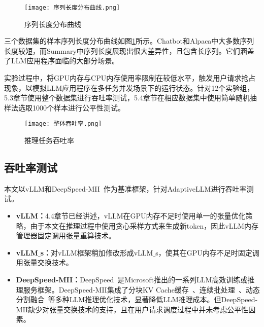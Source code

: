 \begin{figure}[!htbp]
  \centering
  \texttt{[image: 序列长度分布曲线.png]}
  \caption{序列长度分布曲线}
  \label{Fig:序列长度分布曲线}
\end{figure}

三个数据集的样本序列长度分布曲线如图\ref{Fig:序列长度分布曲线}所示。Chatbot和Alpaca中大多数序列长度较短，而Summary中序列长度展现出很大差异性，且包含长序列。它们涵盖了LLM应用程序面临的大部分场景。

实验过程中，将GPU内存与CPU内存使用率限制在较低水平，触发用户请求抢占现象，以模拟LLM应用程序在多任务并发场景下的运行状态。针对12个实验组，5.3章节使用整个数据集进行吞吐率测试，5.4章节在相应数据集中使用简单随机抽样法选取1000个样本进行公平性测试。

\begin{figure*}[!htbp]
  \centering
  \texttt{[image: 整体吞吐率.png]}
  \caption{推理任务吞吐率}
  \label{Fig:推理任务吞吐率}
\end{figure*}

\subsection{吞吐率测试}

本文以vLLM和DeepSpeed-MII~\cite{DeepSpeed-MII}作为基准框架，针对AdaptiveLLM进行吞吐率测试。

\begin{itemize}

  \item \textbf{vLLM：}4.4章节已经讲述，vLLM在GPU内存不足时使用单一的张量优化策略，由于本文在推理过程中使用贪心采样方式来生成新token，因此vLLM内存管理器固定调用张量重算技术。
  
  \item \textbf{vLLM$\_$s：}对vLLM框架稍加修改形成vLLM$\_$s，使其在GPU内存不足时固定调用张量交换技术。
  
  \item \textbf{DeepSpeed-MII：}DeepSpeed~\cite{DeepSpeed}是Microsoft推出的一系列LLM高效训练或推理服务框架。DeepSpeed-MII集成了分块KV Cache缓存~\cite{vLLM}、连续批处理~\cite{Continuous-Batching}、动态分割融合~\cite{DeepSpeed-FastGen}等多种LLM推理优化技术，显著降低LLM推理成本。但DeepSpeed-MII缺少对张量交换技术的支持，且在用户请求调度过程中并未考虑公平性因素。
  
\end{itemize}

